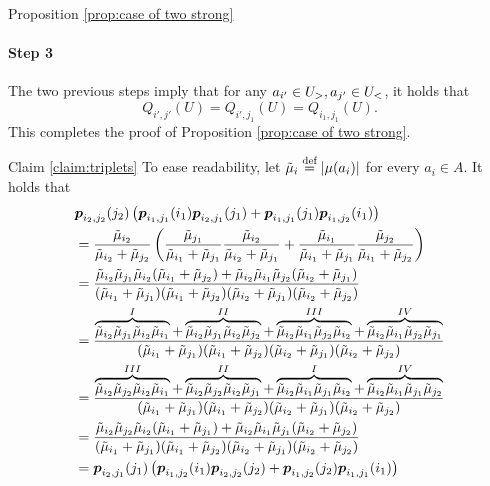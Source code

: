 \begin{proofof}{Proposition \ref{prop:case of two strong}}
\paragraph{Step 3}
The two previous steps imply that for any $a_{i'}\in U_>, a_{j'}\in U_<$, it holds that
\[
Q_{i',j'}(U)=Q_{i',j_1}(U)=Q_{i_1,j_1}(U).
\]
This completes the proof of Proposition \ref{prop:case of two strong}.
\end{proofof}
\begin{proofof}{Claim \ref{claim:triplets}}
To ease readability, let $\tilde \mu_{i}\stackrel{\text{def}}{=}\left| \mu(a_i) \right|$ for every $a_i\in A$. It holds that
\begin{align*}
&\boldsymbol{ p }_{{i_2},{j_2}}({j_2})\left( \boldsymbol{ p }_{{i_1},{j_1}}({i_1})\boldsymbol{ p }_{{i_2},{j_1}}({j_1})+\boldsymbol{ p }_{{i_1},{j_1}}({j_1})\boldsymbol{ p }_{{i_1},{j_2}}({i_1})\right)\\
&=\frac{\tilde \mu_{i_2}}{\tilde \mu_{i_2}+\tilde \mu_{j_2}}\left( \frac{\tilde \mu_{j_1}}{\tilde \mu_{i_1}+\tilde \mu_{j_1}}\frac{\tilde \mu_{i_2}}{\tilde \mu_{i_2}+\tilde \mu_{j_1}}+\frac{\tilde \mu_{i_1}}{\tilde \mu_{i_1}+\tilde \mu_{j_1}}\frac{\tilde \mu_{j_2}}{\tilde \mu_{i_1}+\tilde \mu_{j_2}}\right) \\
&= \frac{\tilde \mu_{i_2}\tilde \mu_{j_1}\tilde \mu_{i_2}(\tilde \mu_{i_1}+\tilde \mu_{j_2})+\tilde \mu_{i_2}\tilde \mu_{i_1}\tilde \mu_{j_2}(\tilde \mu_{i_2}+\tilde \mu_{j_1})}{(\tilde \mu_{i_1}+\tilde \mu_{j_1})(\tilde \mu_{i_1}+\tilde \mu_{j_2})(\tilde \mu_{i_2}+\tilde \mu_{j_1})(\tilde \mu_{i_2}+\tilde \mu_{j_2})}\\
&= \frac{\overbrace{\tilde \mu_{i_2}\tilde \mu_{j_1}\tilde \mu_{i_2}\tilde \mu_{i_1}}^{I}+\overbrace{\tilde \mu_{i_2}\tilde \mu_{j_1}\tilde \mu_{i_2}\tilde \mu_{j_2}}^{II}+\overbrace{\tilde \mu_{i_2}\tilde \mu_{i_1}\tilde \mu_{j_2}\tilde \mu_{i_2}}^{III}+\overbrace{\tilde \mu_{i_2}\tilde \mu_{i_1}\tilde \mu_{j_2}\tilde \mu_{j_1}}^{IV}}{(\tilde \mu_{i_1}+\tilde \mu_{j_1})(\tilde \mu_{i_1}+\tilde \mu_{j_2})(\tilde \mu_{i_2}+\tilde \mu_{j_1})(\tilde \mu_{i_2}+\tilde \mu_{j_2})}\\
&= \frac{\overbrace{\tilde \mu_{i_2}\tilde \mu_{j_2}\tilde \mu_{i_2}\tilde \mu_{i_1}}^{III}+\overbrace{\tilde \mu_{i_2}\tilde \mu_{j_2}\tilde \mu_{i_2}\tilde \mu_{j_1}}^{II}+\overbrace{\tilde \mu_{i_2}\tilde \mu_{i_1}\tilde \mu_{j_1}\tilde \mu_{i_2}}^{I}+\overbrace{\tilde \mu_{i_2}\tilde \mu_{i_1}\tilde \mu_{j_1}\tilde \mu_{j_2}}^{IV}}{(\tilde \mu_{i_1}+\tilde \mu_{j_1})(\tilde \mu_{i_1}+\tilde \mu_{j_2})(\tilde \mu_{i_2}+\tilde \mu_{j_1})(\tilde \mu_{i_2}+\tilde \mu_{j_2})}\\
&= \frac{\tilde \mu_{i_2}\tilde \mu_{j_2}\tilde \mu_{i_2}(\tilde \mu_{i_1}+\tilde \mu_{j_1})+\tilde \mu_{i_2}\tilde \mu_{i_1}\tilde \mu_{j_1}(\tilde \mu_{i_2}+\tilde \mu_{j_2})}{(\tilde \mu_{i_1}+\tilde \mu_{j_1})(\tilde \mu_{i_1}+\tilde \mu_{j_2})(\tilde \mu_{i_2}+\tilde \mu_{j_1})(\tilde \mu_{i_2}+\tilde \mu_{j_2})}\\
&=\boldsymbol{ p }_{{i_2},{j_1}}({j_1})\left(\boldsymbol{ p }_{{i_1},{j_2}}({i_1})\boldsymbol{ p }_{{i_2},{j_2}}({j_2})+\boldsymbol{ p }_{{i_1},{j_2}}({j_2})\boldsymbol{ p }_{{i_1},{j_1}}({i_1})  \right)
\end{align*}
\end{proofof}


